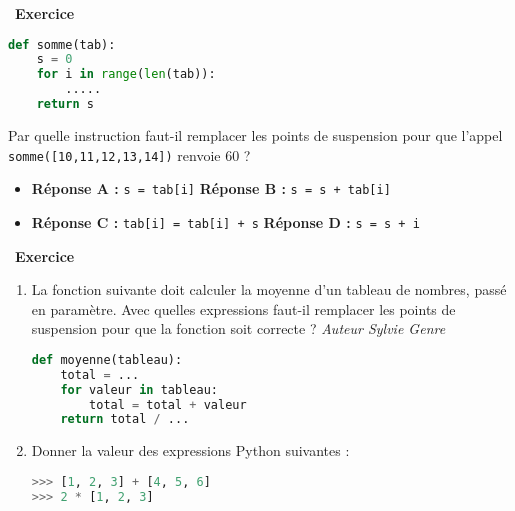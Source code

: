 \documentclass[
  10pt,
]{article}
\newcommand{\passthrough}[1]{#1}
\providecommand{\tightlist}{%
  \setlength{\itemsep}{0pt}\setlength{\parskip}{0pt}}
\newcounter{exo}
\newenvironment{exercice}[1]
{\par \medskip   \addtocounter{exo}{1} \noindent  
\begin{bclogo}[arrondi =0.1,   noborder = true, logo=\bccrayon, marge=4]{~\textbf{Exercice} \textbf{\theexo} {\itshape #1} }  \par}
{
\end{bclogo}
 \par \bigskip }
\newcounter{def}
\begin{document}
\begin{exercice}{}
\begin{lstlisting}[language=Python]
def somme(tab):
    s = 0
    for i in range(len(tab)):
        .....
    return s
\end{lstlisting}

Par quelle instruction faut-il remplacer les points de suspension pour
que l'appel \passthrough{\lstinline!somme([10,11,12,13,14])!} renvoie 60
?

\begin{itemize}
\tightlist
\item
  \textbf{Réponse A :} \passthrough{\lstinline!s = tab[i]!}
  \textbf{Réponse B :} \passthrough{\lstinline!s = s + tab[i]!}
\item
  \textbf{Réponse C :} \passthrough{\lstinline!tab[i] = tab[i] + s!}
  \textbf{Réponse D :} \passthrough{\lstinline!s = s + i!}
\end{itemize}

\end{exercice}

\begin{exercice}{}

\begin{enumerate}
\def\labelenumi{\arabic{enumi}.}
\item
  La fonction suivante doit calculer la moyenne d'un tableau de nombres,
  passé en paramètre. Avec quelles expressions faut-il remplacer les
  points de suspension pour que la fonction soit correcte ? \emph{Auteur
  Sylvie Genre}

\begin{lstlisting}[language=Python]
def moyenne(tableau):
    total = ...
    for valeur in tableau:
        total = total + valeur
    return total / ...
\end{lstlisting}
\item
  Donner la valeur des expressions Python suivantes :

\begin{lstlisting}[language=Python]
>>> [1, 2, 3] + [4, 5, 6]
>>> 2 * [1, 2, 3]
\end{lstlisting}
\end{enumerate}

\end{exercice}
\end{document}
